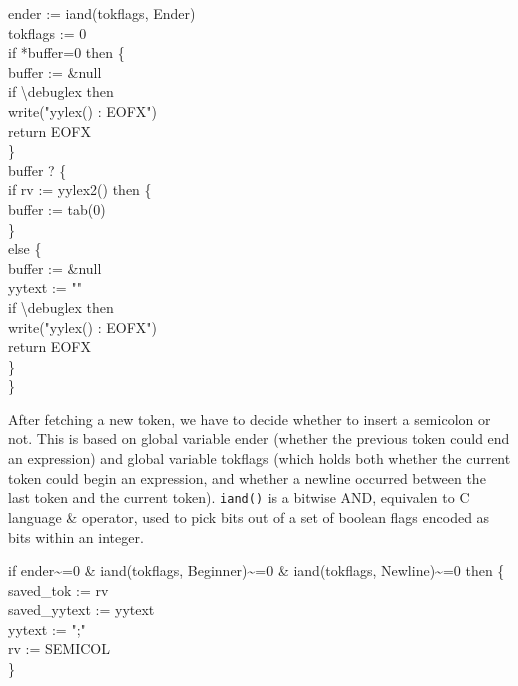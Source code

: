 \begin{iconcode}
\>   ender := iand(tokflags, Ender) \\
\>   tokflags := 0 \\
\>   if *buffer=0 then \{ \\
\> \>     buffer := \&null \\
\> \>     if {\textbackslash}debuglex then \\
\> \> \>        write("yylex() : EOFX") \\
\> \>     return EOFX \\
\> \>    \} \\
\>   buffer ? \{ \\
\> \>     if rv := yylex2() then \{ \\
\> \> \>        buffer := tab(0) \\
\> \> \>        \} \\
\> \>     else \{ \\
\> \> \>       buffer := \&null \\
\> \> \>       yytext := "" \\
\> \> \>       if {\textbackslash}debuglex then \\
\> \> \> \>          write("yylex() : EOFX") \\
\> \> \>       return EOFX \\
\> \> \>       \} \\
\> \>    \}
\end{iconcode}

After fetching a new token, we have to decide whether to insert a
semicolon or not. This is based on global variable ender (whether the
previous token could end an expression) and global variable tokflags
(which holds both whether the current token could begin an expression,
and whether a newline occurred between the last token and the current
token).  \texttt{iand()} is a bitwise AND, equivalen to C language \&
operator, used to pick bits out of a set of boolean flags encoded as
bits within an integer.

\begin{iconcode}
\>   if ender\~{}=0 \& iand(tokflags, Beginner)\~{}=0 \& iand(tokflags, Newline)\~{}=0 then \{ \\
\> \>   saved\_tok := rv \\
\> \>   saved\_yytext := yytext \\
\> \>   yytext := ";" \\
\> \>   rv := SEMICOL \\
\> \>   \}
\end{iconcode}

